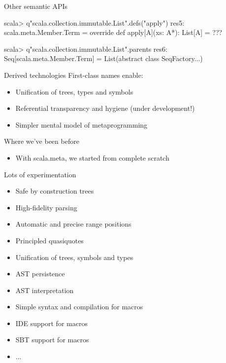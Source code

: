 \documentclass[svgnames,dvipsnames,hyperref={bookmarks=false},usepdftitle=false]{beamer}
\begin{document}
\begin{frame}[fragile]{Other semantic APIs}
\begin{semiverbatim}
scala> q"scala.collection.immutable.List".defs("apply")
res5: scala.meta.Member.Term =
override def apply[A](xs: A*): List[A] = ???

scala> q"scala.collection.immutable.List".parents
res6: Seq[scala.meta.Member.Term] =
List(abstract class SeqFactory...)
\end{semiverbatim}
\end{frame}

\begin{frame}{Derived technologies}
First-class names enable:
\begin{itemize}
\item Unification of trees, types and symbols
\item Referential transparency and hygiene (under development!)
\item Simpler mental model of metaprogramming
\end{itemize}
\end{frame}



\begin{frame}{Where we've been before}
\begin{itemize}
\item With scala.meta, we started from complete scratch
\end{itemize}
\end{frame}

\begin{frame}{Lots of experimentation}
\begin{itemize}
\item Safe by construction trees
\item High-fidelity parsing
\item Automatic and precise range positions
\item Principled quasiquotes
\item Unification of trees, symbols and types
\item AST persistence
\item AST interpretation
\item Simple syntax and compilation for macros
\item IDE support for macros
\item SBT support for macros
\item ...
\end{itemize}
\end{frame}
\end{document}
